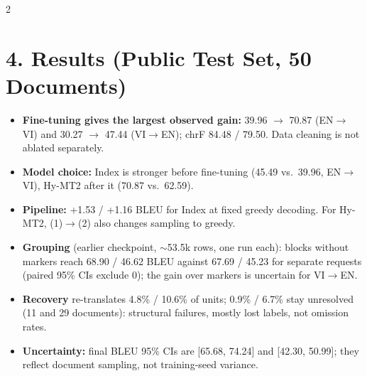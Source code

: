 \documentclass[a0,portrait]{a0poster}
\newcommand{\envi}{EN$\rightarrow$VI}
\newcommand{\vien}{VI$\rightarrow$EN}
\newcommand{\psec}[1]{\section*{\fontsize{46}{52}\selectfont\color{NavyBlue}#1}}  %
\begin{document}
\begin{multicols}{2}
\begin{center}
\end{center}

\psec{4. Results (Public Test Set, 50 Documents)}

\begin{itemize}
\item \textbf{Fine-tuning gives the largest observed gain:} 39.96 $\to$ 70.87 (\envi) and 30.27 $\to$ 47.44 (\vien); chrF 84.48 / 79.50. Data cleaning is not ablated separately.
\item \textbf{Model choice:} Index is stronger before fine-tuning (45.49 vs.\ 39.96, \envi), Hy-MT2 after it (70.87 vs.\ 62.59).
\item \textbf{Pipeline:} +1.53 / +1.16 BLEU for Index at fixed greedy decoding. For Hy-MT2, (1)$\to$(2) also changes sampling to greedy.
\item \textbf{Grouping} (earlier checkpoint, $\sim$53.5k rows, one run each): blocks without markers reach 68.90 / 46.62 BLEU against 67.69 / 45.23 for separate requests (paired 95\% CIs exclude 0); the gain over markers is uncertain for \vien.
\item \textbf{Recovery} re-translates 4.8\% / 10.6\% of units; 0.9\% / 6.7\% stay unresolved (11 and 29 documents): structural failures, mostly lost labels, not omission rates.
\item \textbf{Uncertainty:} final BLEU 95\% CIs are [65.68, 74.24] and [42.30, 50.99]; they reflect document sampling, not training-seed variance.
\end{itemize}


\end{multicols}
\end{document}
